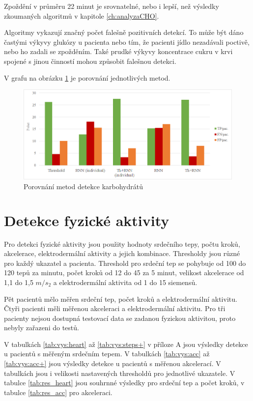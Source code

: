 Zpoždění v průměru 22 minut je srovnatelné, nebo i lepší, než výsledky zkoumaných algoritmů v kapitole \ref{ch:analyzaCHO}.

Algoritmy vykazují značný počet falešně pozitivních detekcí. To může být dáno častými výkyvy glukózy u pacienta nebo tím, že pacienti jídlo nezadávali poctivě, nebo ho zadali se zpožděním. Také prudké výkyvy koncentrace cukru v krvi spojené s jinou činností mohou způsobit falešnou detekci.

V grafu na obrázku \ref{fig:res_cho} je porovnání jednotlivých metod.

\begin{figure}[H]
\caption{Porovnání metod detekce karbohydrátů}
\label{fig:res_cho}
\includegraphics[width=1\textwidth]{img/vysledky/cho/tp.png}
\end{figure}


\section{Detekce fyzické aktivity}

Pro detekci fyzické aktivity jsou použity hodnoty srdečního tepy, počtu kroků, akcelerace, elektrodermální aktivity a jejich kombinace. Thresholdy jsou různé pro každý ukazatel a pacienta. Threshold pro srdeční tep se pohybuje od 100 do 120 tepů za minutu, počet kroků od 12 do 45 za 5 minut, velikost akcelerace od 1,1 do 1,5 $m/s_{2}$ a elektrodermální aktivita od 1 do 15 siemensů.

Pět pacientů mělo měřen srdeční tep, počet kroků a elektrodermální aktivitu. Čtyři pacienti měli měřenou akceleraci a elektrodermální aktivitu. Pro tři pacienty nejsou dostupná testovací data se zadanou fyzickou aktivitou, proto nebyly zařazeni do testů.

V tabulkách \ref{tab:vys:heart} až \ref{tab:vys:steps+} v příloze A jsou výsledky detekce u pacientů s měřeným srdečním tepem. V tabulkách \ref{tab:vys:acc} až \ref{tab:vys:acc+} jsou výsledky detekce u pacientů s měřenou akcelerací. V tabulkách jsou i velikosti nastavených thresholdů pro jednotlivé ukazatele. V tabulce \ref{tab:res_heart} jsou souhrnné výsledky pro srdeční tep a počet kroků, v tabulce \ref{tab:res_acc} pro akceleraci.

